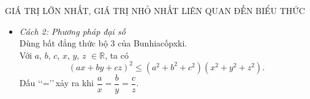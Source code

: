 \begin{dang}{GIÁ TRỊ LỚN NHẤT, GIÁ TRỊ NHỎ NHẤT LIÊN QUAN ĐẾN BIỂU THỨC}
\begin{bt}
{\begin{itemize}
\begin{itemize}
					Lập PTTS đường thẳng $I M$ với $\heva{&\text{qua } I \\&\vec{u}_{I M}=\vec{n}_P=(A ; B ; C).}$\\
					Ta có $M=I M \cap (P) \Rightarrow$ tọa độ điểm $M$ cần tìm.
				\end{itemize}
				\item \textit{Cách 2: Phương pháp đại số}\\
				Dùng bất đẳng thức bộ $3$ của Bunhiacốpxki.\\
				Với $a$, $b$, $c$, $x$, $y$, $z$ $\in \mathbb{R}$, ta có
				\[(a x+b y+c z)^2  \leq(a^2+b^2+c^2)(x^2+y^2+z^2).\]
				Dấu \lq\lq  =\rq\rq\,xảy ra khi $\dfrac{a}{x}=\dfrac{b}{y}=\dfrac{c}{z}.$
			\end{itemize}	
		}
	\end{bt}
	

\end{dang}
